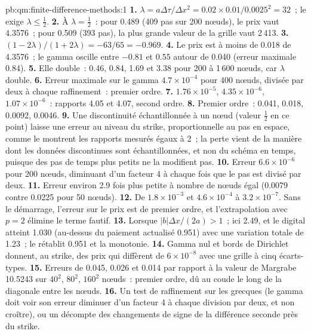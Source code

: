 \begin{solution}{pb:qm:finite-difference-methods:1}
\textbf{1.} $\lambda = a\Delta\tau/\Delta x^2 = 0.02 \times 0.01/0.0025^2 = 32$~; le  exige $\lambda \le \frac12$.
\textbf{2.} À $\lambda = \frac12$~: pour 0.489 (409 pas sur 200 nœuds), le prix vaut 4.3576~; pour 0.509 (393 pas), la plus grande valeur de la grille vaut 2\,413.
\textbf{3.} $(1 - 2\lambda)/(1 + 2\lambda) = -63/65 = -0.969$.
\textbf{4.} Le prix est à moins de 0.018 de 4.3576~; le gamma oscille entre $-0.81$ et $0.55$ autour de 0.040 (erreur maximale 0.84).
\textbf{5.} Elle double~: 0.46, 0.84, 1.69 et 3.38 pour 200 à 1\,600 nœuds, car $\lambda$ double.
\textbf{6.} Erreur maximale sur le gamma $4.7 \times 10^{-4}$ pour 400 nœuds, divisée par deux à chaque raffinement~: premier ordre.
\textbf{7.} $1.76 \times 10^{-5}$, $4.35 \times 10^{-6}$, $1.07 \times 10^{-6}$~: rapports 4.05 et 4.07, second ordre.
\textbf{8.} Premier ordre~: 0.041, 0.018, 0.0092, 0.0046.
\textbf{9.} Une discontinuité échantillonnée à un nœud (valeur $\frac12$ en ce point) laisse une erreur au niveau du strike, proportionnelle au pas en espace, comme le montrent les rapports mesurés égaux à 2~; la perte vient de la manière dont
les données discontinues sont échantillonnées, et non du schéma en temps, puisque des pas de temps plus petits ne la modifient pas.
\textbf{10.} Erreur $6.6 \times 10^{-6}$ pour 200 nœuds, diminuant d'un facteur 4 à chaque fois que le pas est divisé par deux.
\textbf{11.} Erreur environ 2.9 fois plus petite à nombre de nœuds égal (0.0079 contre 0.0225 pour 50 nœuds).
\textbf{12.} De $1.8 \times 10^{-3}$ et $4.6 \times 10^{-4}$ à $3.2 \times 10^{-7}$. Sans le démarrage, l'erreur sur le prix est de premier ordre, et l'extrapolation avec $p = 2$ élimine le terme fautif.
\textbf{13.} Lorsque $|b|\Delta x/(2a) > 1$~; ici 2.49, et le digital atteint 1.030 (au-dessus du paiement actualisé 0.951) avec une variation totale de 1.23~; le  rétablit 0.951 et la monotonie.
\textbf{14.} Gamma nul et bords de Dirichlet donnent, au strike, des prix qui diffèrent de $6 \times 10^{-8}$ avec une grille à cinq écarts-types.
\textbf{15.} Erreurs de 0.045, 0.026 et 0.014 par rapport à la valeur de Margrabe 10.5243 sur $40^2$, $80^2$, $160^2$ nœuds~: premier ordre, dû au coude le long de la diagonale entre les nœuds.
\textbf{16.} Un test de raffinement sur les grecques (le gamma doit voir son erreur diminuer d'un facteur 4 à chaque division par deux, et non croître), ou un décompte des changements de signe de la différence seconde près du strike.

\end{solution}
